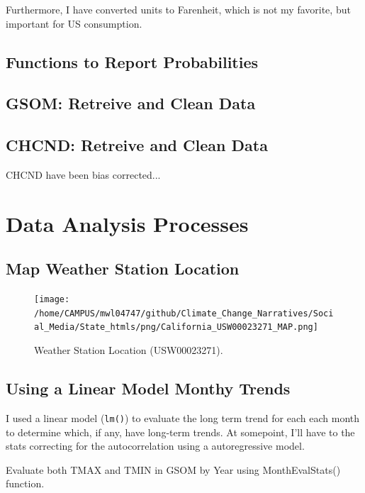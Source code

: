 \documentclass{article}\usepackage[]{graphicx}\usepackage[]{color}
\begin{document}
Furthermore, I have converted units to Farenheit, which is not my favorite, but important for US consumption.

\subsection{Functions to Report Probabilities}




\subsection{GSOM: Retreive and Clean Data}



\subsection{CHCND: Retreive and Clean Data}

CHCND have been bias corrected...


\section{Data Analysis Processes}

\subsection{Map Weather Station Location}






\begin{figure}
\texttt{[image: /home/CAMPUS/mwl04747/github/Climate\_Change\_Narratives/Social\_Media/State\_htmls/png/California\_USW00023271\_MAP.png]}
\caption{Weather Station Location (USW00023271). }
\label{fig:Map}
\end{figure}

\subsection{Using a Linear Model Monthy Trends}

I used a linear model (\texttt{lm()}) to evaluate the long term trend for each each month to determine which, if any, have long-term trends. At somepoint, I'll have to the stats correcting for the autocorrelation using a autoregressive model.  



Evaluate both TMAX and TMIN in GSOM by Year using MonthEvalStats() function. 
\end{document}
